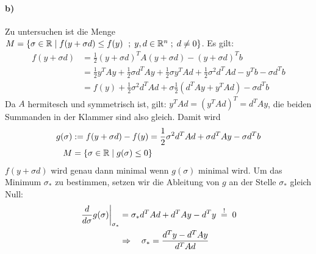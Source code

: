 \paragraph*{b)}
Zu untersuchen ist die Menge $M = \{\sigma \in \mathbb R \mid f(y + \sigma d) \le f(y)\ \;;\; y, d \in \mathbb R^n \;;\; d \ne 0 \}$. Es gilt:
\begin{align*}
  f(y + \sigma d) & = \frac{1}{2} (y + \sigma d)^T A (y + \sigma d) - (y + \sigma d)^T b\\
  & =   \frac{1}{2}y^TA y  + \frac{1}{2}\sigma d^T A y + \frac{1}{2}\sigma y^T A d
      + \frac{1}{2} \sigma^2 d^T A d - y^T b - \sigma d^T b\\
  & = f(y) + \frac{1}{2} \sigma^2 d^T A d + \sigma \frac{1}{2} (d^T A y
      + y^T A d) - \sigma d^T b
\end{align*}
Da $A$ hermitesch und symmetrisch ist, gilt: $y^T A d = (y^T A d )^T = d^T A y$,
die beiden Summanden in der Klammer sind also gleich. Damit wird
\begin{align*}
 g(\sigma) & := f(y + \sigma d) - f(y) = \frac{1}{2} \sigma^2 d^T A d  + \sigma d^T A y -  \sigma d^T b\\
 M & = \{\sigma \in \mathbb R \mid  g(\sigma) \le 0\}
\end{align*}
$f(y + \sigma d)$ wird genau dann minimal wenn $g(\sigma)$ minimal wird.
Um das Minimum $\sigma_*$ zu bestimmen, setzen wir die Ableitung von $g$
an der Stelle $\sigma_*$ gleich Null:
\begin{align*}
  \left. \frac{d}{d \sigma} g(\sigma) \right|_{\sigma_*}
  &= \sigma_* d^T A d + d^T A y - d^T y\;\overset{!}{=} \; 0 \\
  & \Rightarrow \quad \sigma_* = \frac{d^T y-d^T A y} {d^T A d}
\end{align*}



